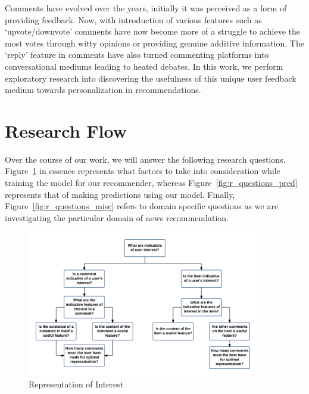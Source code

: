 Comments have evolved over the years, initially it was perceived as a form of providing feedback. Now, with introduction of various features such as `upvote/downvote' comments have now become more of a struggle to achieve the most votes through witty opinions or providing genuine additive information. The `reply' feature in comments have also turned commenting platforms into conversational mediums leading to heated debates. In this work, we perform exploratory research into discovering the usefulness of this unique user feedback medium towards personalization in recommendations.

\newpage
\section{Research Flow}
Over the course of our work, we will answer the following research questions. Figure~\ref{fig:r_questions_rep} in essence represents what factors to take into consideration while training the model for our recommender, whereas Figure~\ref{fig:r_questions_pred} represents that of making predictions using our model. Finally, Figure~\ref{fig:r_questions_misc} refers to domain specific questions as we are investigating the particular domain of news recommendation.

\begin{figure}[!h]
\centering
\includegraphics[width=0.905\textwidth]{c-intro_images/r_questions_1.png}
\caption{Representation of Interest}
\label{fig:r_questions_rep}
\end{figure}

